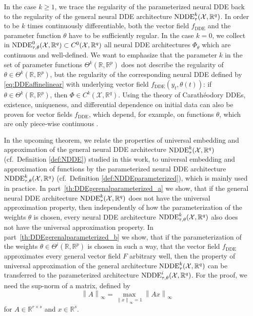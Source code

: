 \documentclass[10pt]{article}
\numberwithin{equation}{section}
\newcommand\norm[1]{\left\lVert#1\right\rVert}
\begin{document}
	In the case $k\geq 1$, we trace the regularity of the parameterized neural DDE back to the regularity of the general neural DDE architecture $\textup{NDDE}_{\tau}^k(\mathcal{X},\mathbb{R}^q)$. In order to be $k$ times continuously differentiable, both the vector field $f_\text{DDE}$ and the parameter function $\theta$ have to be sufficiently regular. In the case $k = 0$, we collect in $\textup{NDDE}_{\tau,\theta}^0(\mathcal{X},\mathbb{R}^q)\subset C^0(\mathcal{X},\mathbb{R}^q)$ all neural DDE architectures $\Phi_\theta$ which are continuous and well-defined. We want to emphasize that the parameter $k$ in the set of parameter functions $\Theta^k(\mathbb{R},\mathbb{R}^{p})$ does not describe the regularity of $\theta \in \Theta^k(\mathbb{R},\mathbb{R}^{p})$, but the regularity of the corresponding neural DDE defined by \eqref{eq:DDEaffinelinear} with underlying vector field $f_\text{DDE}(y_t,\theta(t))$: if $\theta \in \Theta^k(\mathbb{R},\mathbb{R}^{p})$, then $\Phi \in C^k(\mathcal{X},\mathbb{R}^q)$. Using the theory of Carathéodory DDEs, existence, uniqueness, and differential dependence on initial data can also be proven for vector fields $f_\text{DDE}$, which depend, for example, on functions $\theta$, which are only piece-wise continuous \cite{Hale1993}.
	
	In the upcoming theorem, we relate the properties of universal embedding and approximation of the general neural DDE architecture $\textup{NDDE}_{\tau}^k(\mathcal{X},\mathbb{R}^q)$  (cf.\ Definition \ref{def:NDDE}) studied in this work, to universal embedding and approximation of functions by the parameterized neural DDE architecture $\textup{NDDE}_{\tau,\theta}^k(\mathcal{X},\mathbb{R}^q)$ (cf.\ Definition \ref{def:NDDEparameterized}), which is mainly used in practice. In part~\ref{th:DDEgerenalparameterized_a} we show, that if the general neural DDE architecture  $\textup{NDDE}_{\tau}^k(\mathcal{X},\mathbb{R}^q)$ does not have the universal approximation property, then independently of how the parameterization of the weights $\theta$ is chosen, every neural DDE architecture $\textup{NDDE}_{\tau,\theta}^k(\mathcal{X},\mathbb{R}^q)$ also does not have the universal approximation property. In part~\ref{th:DDEgerenalparameterized_b} we show, that if the parameterization of the weights $\theta \in \Theta^i(\mathbb{R},\mathbb{R}^{p})$ is chosen in such a way, that the vector field $f_\text{DDE}$ approximates every general vector field $F$ arbitrary well, then the property of universal approximation of the general architecture  $\textup{NDDE}_{\tau}^k(\mathcal{X},\mathbb{R}^q)$ can be transferred to the parameterized architecture $\textup{NDDE}_{\tau,\theta}^i(\mathcal{X},\mathbb{R}^q)$.
	For the proof, we need the sup-norm of a matrix, defined by
	\begin{equation}\label{eq:matrixnorm}
		\norm{A}_\infty = \max_{\norm{x}_\infty = 1} \norm{Ax}_\infty
	\end{equation}
	for $A \in \mathbb{R}^{r \times s}$ and $x \in \mathbb{R}^s$.	
	
\end{document}
